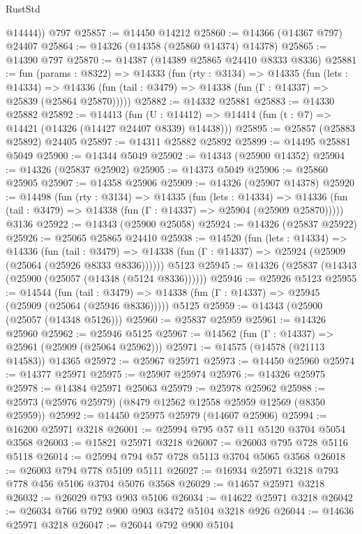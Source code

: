 \begin{lexlean}{RustStd}
\begin{coremodule}
        @14444))
    @797
@25857 := @14450 @14212
@25860 := @14366 (@14367 @797) @24407
@25864 := @14326 (@14358 (@25860 @14374) @14378)
@25865 := @14390 @797
@25870 := @14387 (@14389 @25865 @24410 @8333 @8336)
@25881 := fun (params : @8322) =>
  @14333
    (fun (rty : @3134) =>
    @14335
      (fun (lets : @14334) =>
      @14336 (fun (tail : @3479) => @14338 (fun (Γ : @14337) => @25839 (@25864 @25870)))))
@25882 := @14332 @25881
@25883 := @14330 @25882
@25892 := @14413
    (fun (U : @14412) => @14414 (fun (t : @7) => @14421 (@14326 (@14427 @24407 @8339) @14438)))
@25895 := @25857 (@25883 @25892) @24405
@25897 := @14311 @25882 @25892
@25899 := @14495 @25881 @5049
@25900 := @14344 @5049
@25902 := @14343 (@25900 @14352)
@25904 := @14326 (@25837 @25902)
@25905 := @14373 @5049
@25906 := @25860 @25905
@25907 := @14358 @25906
@25909 := @14326 (@25907 @14378)
@25920 := @14498
    (fun (rty : @3134) =>
    @14335
      (fun (lets : @14334) =>
      @14336 (fun (tail : @3479) => @14338 (fun (Γ : @14337) => @25904 (@25909 @25870)))))
    @3136
@25922 := @14343 (@25900 @25058)
@25924 := @14326 (@25837 @25922)
@25926 := @25065 @25865 @24410
@25938 := @14520
    (fun (lets : @14334) =>
    @14336
      (fun (tail : @3479) =>
      @14338 (fun (Γ : @14337) => @25924 (@25909 (@25064 (@25926 @8333 @8336))))))
    @5123
@25945 := @14326 (@25837 (@14343 (@25900 (@25057 (@14348 (@5124 @8336))))))
@25946 := @25926 @5123
@25955 := @14544
    (fun (tail : @3479) => @14338 (fun (Γ : @14337) => @25945 (@25909 (@25064 (@25946 @8336)))))
    @5125
@25959 := @14343 (@25900 (@25057 (@14348 @5126)))
@25960 := @25837 @25959
@25961 := @14326 @25960
@25962 := @25946 @5125
@25967 := @14562 (fun (Γ : @14337) => @25961 (@25909 (@25064 @25962)))
@25971 := @14575 (@14578 (@21113 @14583)) @14365
@25972 := @25967 @25971
@25973 := @14450 @25960
@25974 := @14377 @25971
@25975 := @25907 @25974
@25976 := @14326 @25975
@25978 := @14384 @25971 @25063
@25979 := @25978 @25962
@25988 := @25973 (@25976 @25979) (@8479 @12562 @12558 @25959 @12569 (@8350 @25959))
@25992 := @14450 @25975 @25979 (@14607 @25906)
@25994 := @16200 @25971 @3218
@26001 := @25994 @795 @57 @11 @5120 @3704 @5054 @3568
@26003 := @15821 @25971 @3218
@26007 := @26003 @795 @728 @5116 @5118
@26014 := @25994 @794 @57 @728 @5113 @3704 @5065 @3568
@26018 := @26003 @794 @778 @5109 @5111
@26027 := @16934 @25971 @3218 @793 @778 @456 @5106 @3704 @5076 @3568
@26029 := @14657 @25971 @3218
@26032 := @26029 @793 @903 @5106
@26034 := @14622 @25971 @3218
@26042 := @26034 @766 @792 @900 @903 @3472 @5104 @3218 @926
@26044 := @14636 @25971 @3218
@26047 := @26044 @792 @900 @5104

\end{coremodule}
\end{lexlean}
